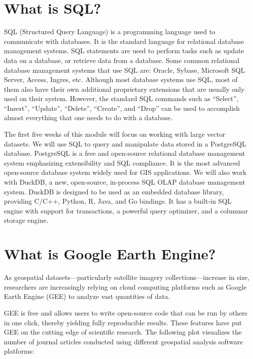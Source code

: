 \documentclass[
  letterpaper,
  DIV=11,
  numbers=noendperiod]{scrreprt}
\begin{document}
\section*{What is SQL?}\label{what-is-sql}


SQL (Structured Query Language) is a programming language used to
communicate with databases. It is the standard language for relational
database management systems. SQL statements are used to perform tasks
such as update data on a database, or retrieve data from a database.
Some common relational database management systems that use SQL are:
Oracle, Sybase, Microsoft SQL Server, Access, Ingres, etc. Although most
database systems use SQL, most of them also have their own additional
proprietary extensions that are usually only used on their system.
However, the standard SQL commands such as ``Select'', ``Insert'',
``Update'', ``Delete'', ``Create'', and ``Drop'' can be used to
accomplish almost everything that one needs to do with a database.

The first five weeks of this module will focus on working with large
vector datasets. We will use SQL to query and manipulate data stored in
a PostgreSQL database. PostgreSQL is a free and open-source relational
database management system emphasizing extensibility and SQL compliance.
It is the most advanced open-source database system widely used for GIS
applications. We will also work with DuckDB, a new, open-source,
in-process SQL OLAP database management system. DuckDB is designed to be
used as an embedded database library, providing C/C++, Python, R, Java,
and Go bindings. It has a built-in SQL engine with support for
transactions, a powerful query optimizer, and a columnar storage engine.

\section*{What is Google Earth
Engine?}\label{what-is-google-earth-engine}


As geospatial datasets---particularly satellite imagery
collections---increase in size, researchers are increasingly relying on
cloud computing platforms such as Google Earth Engine (GEE) to analyze
vast quantities of data.

GEE is free and allows users to write open-source code that can be run
by others in one click, thereby yielding fully reproducible results.
These features have put GEE on the cutting edge of scientific research.
The following plot visualizes the number of journal articles conducted
using different geospatial analysis software platforms:
\end{document}
